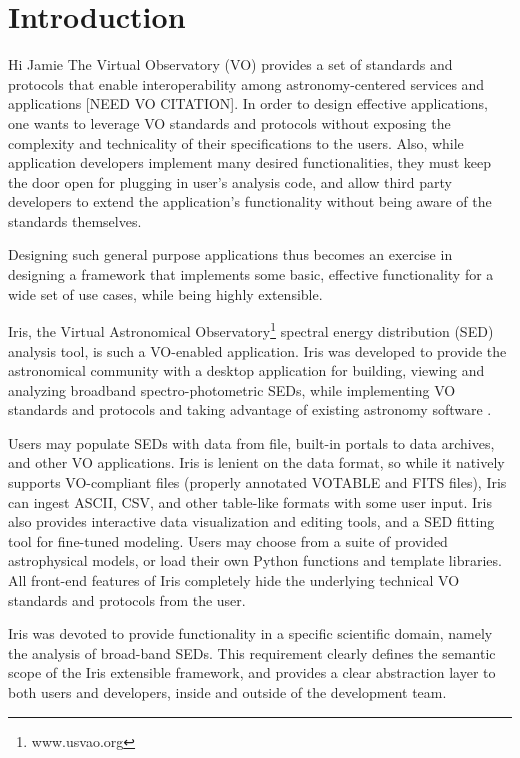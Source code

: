 \label{sec:introduction}
\section{Introduction} 
Hi Jamie
The Virtual Observatory (VO) provides a set of standards and protocols that enable interoperability among astronomy-centered services and applications [NEED VO CITATION].
In order to design effective applications, one wants to leverage VO standards and protocols without exposing the complexity and technicality of their specifications to the users. Also, while application developers implement many desired functionalities, they must keep the door open for plugging in user's analysis code, and allow third party developers to extend the application's functionality without being aware of the standards themselves.

Designing such general purpose applications thus becomes an exercise in designing a framework that implements some basic, effective functionality for a wide set of use cases, while being highly extensible.

Iris, the Virtual Astronomical Observatory\footnote{www.usvao.org} \cite{2012SPIE.8449E..0HB} spectral energy distribution (SED) analysis tool, is such a VO-enabled application. Iris was developed to provide the astronomical community with a desktop application for building, viewing and analyzing broadband spectro-photometric SEDs, while implementing VO standards and protocols and taking advantage of existing astronomy software \cite{2012ASPC..461..893D,2013AAS...22124038L}.

Users may populate SEDs with data from file, built-in portals to data archives, and other VO applications. Iris is lenient on the data format, so while it natively supports VO-compliant files (properly annotated VOTABLE and FITS files), Iris can ingest ASCII, CSV, and other table-like formats with some user input. Iris also provides interactive data visualization and editing tools, and a SED fitting tool for fine-tuned modeling. Users may choose from a suite of provided astrophysical models, or load their own Python functions and template libraries. All front-end features of Iris completely hide the underlying technical VO standards and protocols from the user.

Iris was devoted to provide functionality in a specific scientific domain, namely the analysis of broad-band SEDs. This requirement clearly defines the semantic scope of the  Iris extensible framework, and provides a clear abstraction layer to both users and developers, inside and outside of the development team.

